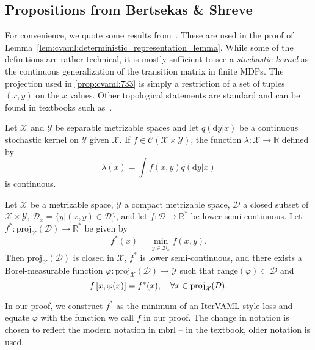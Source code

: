 \subsection{Propositions from Bertsekas \& Shreve}
\label{sec:cvaml:bertsekas}

For convenience, we quote some results from~\textcite{bertsekasshreve1978}.
These are used in the proof of Lemma~\ref{lem:cvaml:deterministic_representation_lemma}.
While some of the definitions are rather technical, it is mostly sufficient to see a \emph{stochastic kernel} as the continuous generalization of the transition matrix in finite MDPs.
The projection used in \autoref{prop:cvaml:733} is simply a restriction of a set of tuples $(x,y)$ on the $x$ values.
Other topological statements are standard and can be found in textbooks such as~\textcite{munkres2018}.


\begin{proposition}[Proposition~7.30]
\label{prop:cvaml:730}
    Let $\mathcal{X}$ and $\mathcal{Y}$ be separable metrizable spaces and let $q(\mathrm{d}y|x)$ be a continuous stochastic kernel on $\mathcal{Y}$ given $\mathcal{X}$. If $f\in\mathcal{C}(\mathcal{X}\times \mathcal{Y})$, the function $\lambda: \mathcal{X} \rightarrow \mathbb{R}$ defined by
    \[
        \lambda(x) = \int f(x,y) q(\mathrm{d}y|x)
    \]
    is continuous.
\end{proposition}

\newcommand{\proj}{\text{proj}}
\begin{proposition}[Proposition~7.33]
\label{prop:cvaml:733}
    Let $\mathcal{X}$ be a metrizable space, $\mathcal{Y}$ a compact metrizable space, $\mathcal{D}$ a closed subset of $\mathcal{X}\times\mathcal{Y}$, $\mathcal{D}_x = \{y | (x,y) \in \mathcal{D} \}$, and let $f:\mathcal{D}\rightarrow \mathbb{R}^*$ be lower semi-continuous.
    Let $f^*:\proj_\mathcal{X}(\mathcal{D}) \rightarrow \mathbb{R}^*$ be given by \[
    f^*(x) = \min_{y \in \mathcal{D}_x} f(x,y).
    \]
    Then $\proj_\mathcal{X}(\mathcal{D})$ is closed in $\mathcal{X}$, $f^*$ is lower semi-continuous, and there exists a Borel-measurable function $\varphi: \proj_\mathcal{X}(\mathcal{D}) \rightarrow \mathcal{Y}$ such that $\text{range}(\varphi) \subset \mathcal{D}$ and \[
    f\squareb{x, \varphi(x)} = f^*(x), \quad \forall x \in \proj_\mathcal{X}(\mathcal{D}).
    \]
\end{proposition}

In our proof, we construct $f^*$ as the minimum of an IterVAML style loss and equate $\varphi$ with the function we call $f$ in our proof.
The change in notation is chosen to reflect the modern notation in \ac{mbrl} -- in the textbook, older notation is used.
\label{app:cvaml:conjecture}
